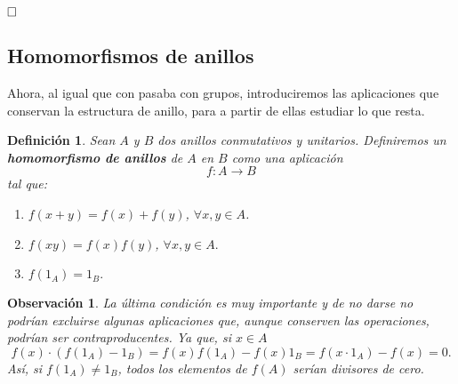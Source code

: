 \documentclass[12pt]{article}
\newtheorem{definition}[theorem]{Definición}
\newtheorem{observation}{Observación}[theorem]
\begin{document}
$\hfill \square$

\subsection{Homomorfismos de anillos}

Ahora, al igual que con pasaba con grupos, introduciremos las aplicaciones que conservan la estructura de anillo, para a partir de ellas estudiar lo que resta.

\begin{definition} Sean $A$ y $B$ dos anillos conmutativos y unitarios. Definiremos un \textbf{homomorfismo de anillos} de $A$ en $B$ como una aplicación $$f \colon A \longrightarrow B$$ tal que: \begin{enumerate}
\item $f(x + y) = f(x) + f(y)$, $\forall x,y \in A$.
\item $f(xy) = f(x)f(y)$, $\forall x,y \in A.$
\item $f(1_{A}) = 1_{B}.$
\end{enumerate}
\end{definition}
\begin{observation} La última condición es muy importante y de no darse no podrían excluirse algunas aplicaciones que, aunque conserven las operaciones, podrían ser contraproducentes. Ya que, si $x \in A$ $$f(x) \cdot (f(1_{A}) - 1_{B}) = f(x) f(1_{A}) - f(x)1_{B} = f(x \cdot 1_{A}) - f(x) = 0.$$ Así, si $f(1_{A}) \neq 1_{B}$, todos los elementos de $f(A)$ serían divisores de cero. 
\end{observation}
\end{document}
